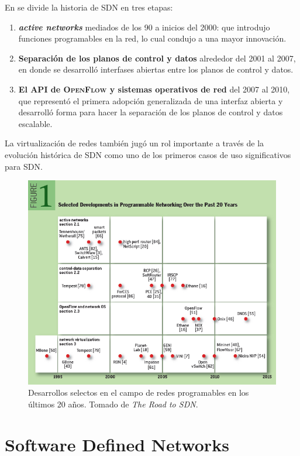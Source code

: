 \documentclass[10pt,journal,compsoc]{IEEEtran}
\begin{document}
En \cite{rexford} se divide la historia de SDN en tres etapas: 
\begin{enumerate}
    \item \textbf{\emph{active networks}} mediados de los 90 a inicios del 2000: que introdujo funciones programables en la red, lo cual condujo a una mayor innovación.
    \item \textbf{Separación de los planos de control y datos} alrededor del 2001 al 2007, en donde se desarrolló interfases abiertas entre los planos de control y datos.
    \item \textbf{El API de \textsc{OpenFlow} y sistemas operativos de red} del 2007 al 2010, que representó el primera adopción generalizada de una interfaz abierta y desarrolló forma para hacer la separación de los planos de control y datos escalable.
\end{enumerate}
La virtualización de redes también jugó un rol importante a través de la evolución histórica de SDN como uno de los primeros casos de uso significativos para SDN.

\begin{figure}[h]
    \center
    \includegraphics[width=15cm]{sdn-history}
    \caption{Desarrollos selectos en el campo de redes programables en los últimos 20 años. Tomado de \emph{The Road to SDN}\cite{rexford}.}
    \label{fig:tradicitional-architecture}
\end{figure}


\section{Software Defined Networks}
\end{document}
